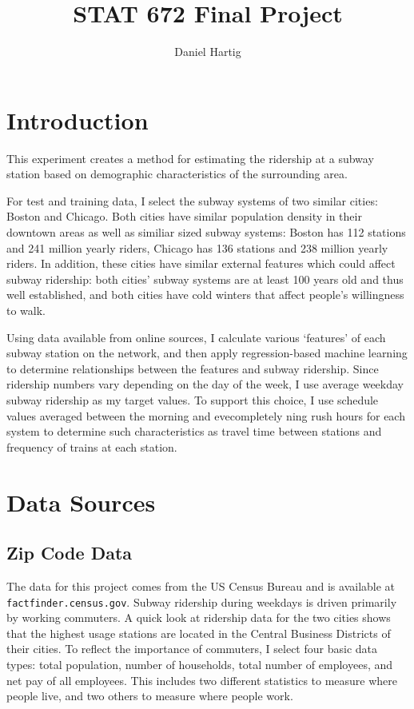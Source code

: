 \documentclass{article}
\title{STAT 672 Final Project}
\author{Daniel Hartig}
\begin{document}
\maketitle

\section{Introduction}

This experiment creates a method for estimating the ridership at a subway station based on demographic characteristics of the surrounding area. 

For test and training data, I select the subway systems of two similar cities: Boston and Chicago. Both cities have similar population density in their downtown areas as well as similiar sized subway systems: Boston has 112 stations and 241 million yearly riders, Chicago has 136 stations and 238 million yearly riders. In addition, these cities have similar external features which could affect subway ridership: both cities' subway systems are at least 100 years old and thus well established, and both cities have cold winters that affect people's willingness to walk. 

Using data available from online sources, I calculate various `features' of each subway station on the network, and then apply regression-based machine learning to determine relationships between the features and subway ridership. Since ridership numbers vary depending on the day of the week, I use average weekday subway ridership as my target values. To support this choice, I use schedule values averaged between the morning and evecompletely ning rush hours for each system to determine such characteristics as travel time between stations and frequency of trains at each station. 

\section{Data Sources}

\subsection{Zip Code Data}

The data for this project comes from the US Census Bureau and is available at \texttt{factfinder.census.gov}. Subway ridership during weekdays is driven primarily by working commuters. A quick look at ridership data for the two cities shows that the highest usage stations are located in the Central Business Districts of their cities. To reflect the importance of commuters, I select four basic data types: total population, number of households, total number of employees, and net pay of all employees. This includes two different statistics to measure where people live, and two others to measure where people work. 
\end{document}
